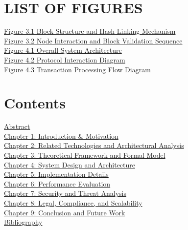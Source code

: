 \section*{LIST OF FIGURES}

\noindent\hyperref[fig:3.1]{Figure 3.1 Block Structure and Hash Linking Mechanism}\dotfill\pageref{fig:3.1}\\
\hyperref[fig:3.2]{Figure 3.2 Node Interaction and Block Validation Sequence}\dotfill\pageref{fig:3.2}\\
\hyperref[fig:4.1]{Figure 4.1 Overall System Architecture}\dotfill\pageref{fig:4.1}\\
\hyperref[fig:4.2]{Figure 4.2 Protocol Interaction Diagram}\dotfill\pageref{fig:4.2}\\
\hyperref[fig:4.3]{Figure 4.3 Transaction Processing Flow Diagram}\dotfill\pageref{fig:4.3}

\newpage

\section*{Contents}

\noindent\hyperref[sec:abstract]{Abstract}\dotfill\pageref{sec:abstract}\\
\hyperref[ch:1]{Chapter 1: Introduction \& Motivation}\dotfill\pageref{ch:1}\\
\hyperref[ch:2]{Chapter 2: Related Technologies and Architectural Analysis}\dotfill\pageref{ch:2}\\
\hyperref[ch:3]{Chapter 3: Theoretical Framework and Formal Model}\dotfill\pageref{ch:3}\\
\hyperref[ch:4]{Chapter 4: System Design and Architecture}\dotfill\pageref{ch:4}\\
\hyperref[ch:5]{Chapter 5: Implementation Details}\dotfill\pageref{ch:5}\\
\hyperref[ch:6]{Chapter 6: Performance Evaluation}\dotfill\pageref{ch:6}\\
\hyperref[ch:7]{Chapter 7: Security and Threat Analysis}\dotfill\pageref{ch:7}\\
\hyperref[ch:8]{Chapter 8: Legal, Compliance, and Scalability}\dotfill\pageref{ch:8}\\
\hyperref[ch:9]{Chapter 9: Conclusion and Future Work}\dotfill\pageref{ch:9}\\
\hyperref[sec:bibliography]{Bibliography}\dotfill\pageref{sec:bibliography}

\newpage
{}
\setcounter{page}{1}

